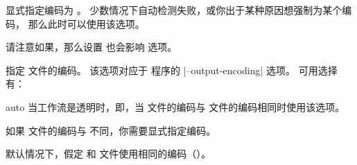 \begin{optionlist}
\begin{valuelist}
显式指定编码为 。
少数情况下自动检测失败，或你出于某种原因想强制为某个编码，
那么此时可以使用该选项。

\end{valuelist}
%
请注意如果，那么设置  也会影响  选项。



指定  文件的编码。
该选项对应于 \biber 程序的 |--output-encoding| 选项。
可用选择有：

\begin{valuelist}

\item[auto] %
当工作流是透明时，即，当  文件的编码与  文件的编码相同时使用该选项。

\item[\prm{encoding}] %
如果  文件的编码与  不同，你需要显式指定编码。

\end{valuelist}


默认情况下，\biblatex 假定  和  文件使用相同的编码（）。




\end{optionlist}
